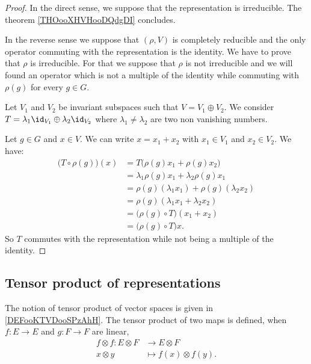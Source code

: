 \begin{proof}
    In the direct sense, we suppose that the representation is irreducible. The theorem \ref{THOooXHVHooDQdgDI} concludes.

    In the reverse sense we suppose that \( (\rho, V)\) is completely reducible and the only operator commuting with the representation is the identity. We have to prove that \( \rho\) is irreducible. For that we suppose that \( \rho\) is not irreducible and we will found an operator which is not a multiple of the identity while commuting with \( \rho(g)\) for every \( g\in G\).
    
    
    Let \( V_1\) and \( V_2\) be invariant subspaces such that \( V=V_1\oplus V_2\). We consider \( T=\lambda_1\id_{V_1}\oplus \lambda_2\id_{V_2}\) where \( \lambda_1\neq \lambda_2\) are two non vanishing numbers.

    Let \( g\in G\) and \( x\in V\). We can write \( x=x_1+x_2\) with \( x_1\in V_1\) and \( x_2\in V_2\). We have:
    \begin{subequations}
        \begin{align}
            \big( T\circ\rho(g) \big)(x)&=T\big( \rho(g)x_1+\rho(g)x_2 \big)\\
            &=\lambda_1\rho(g)x_1+\lambda_2\rho(g)x_1\\
            &=\rho(g)(\lambda_1x_1)+\rho(g)(\lambda_2x_2)\\
            &=\rho(g)(\lambda_1x_1+\lambda_2x_2)\\
            &=\big( \rho(g)\circ T \big)(x_1+x_2)\\
            &=\big( \rho(g)\circ T\big)x.
        \end{align}
    \end{subequations}
    So \( T\) commutes with the representation while not being a multiple of the identity.
\end{proof}

\subsection{Tensor product of representations}

The notion of tensor product of vector spaces is given in \ref{DEFooKTVDooSPzAhH}. The tensor product of two maps is defined, when \( f\colon E\to E\) and \( g\colon F\to F\) are linear,
\begin{equation}
    \begin{aligned}
        f\otimes f\colon E\otimes F&\to E\otimes F \\
        x\otimes y&\mapsto f(x)\otimes f(y). 
    \end{aligned}
\end{equation}

